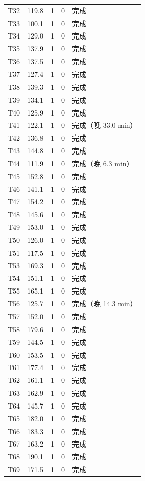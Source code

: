 \documentclass[a4paper,11pt]{article}
\begin{document}
\begin{table}[htbp]
\begin{tabular}{rcccl}
T32 & 119.8 & 1 & 0 & 完成 \\
T33 & 100.1 & 1 & 0 & 完成 \\
T34 & 129.0 & 1 & 0 & 完成 \\
T35 & 137.9 & 1 & 0 & 完成 \\
T36 & 137.5 & 1 & 0 & 完成 \\
T37 & 127.4 & 1 & 0 & 完成 \\
T38 & 139.3 & 1 & 0 & 完成 \\
T39 & 134.1 & 1 & 0 & 完成 \\
T40 & 125.9 & 1 & 0 & 完成 \\
T41 & 122.1 & 1 & 0 & 完成（晚 33.0 min） \\
T42 & 136.8 & 1 & 0 & 完成 \\
T43 & 144.8 & 1 & 0 & 完成 \\
T44 & 111.9 & 1 & 0 & 完成（晚 6.3 min） \\
T45 & 152.8 & 1 & 0 & 完成 \\
T46 & 141.1 & 1 & 0 & 完成 \\
T47 & 154.2 & 1 & 0 & 完成 \\
T48 & 145.6 & 1 & 0 & 完成 \\
T49 & 153.0 & 1 & 0 & 完成 \\
T50 & 126.0 & 1 & 0 & 完成 \\
T51 & 117.5 & 1 & 0 & 完成 \\
T53 & 169.3 & 1 & 0 & 完成 \\
T54 & 151.1 & 1 & 0 & 完成 \\
T55 & 165.1 & 1 & 0 & 完成 \\
T56 & 125.7 & 1 & 0 & 完成（晚 14.3 min） \\
T57 & 152.0 & 1 & 0 & 完成 \\
T58 & 179.6 & 1 & 0 & 完成 \\
T59 & 144.5 & 1 & 0 & 完成 \\
T60 & 153.5 & 1 & 0 & 完成 \\
T61 & 177.4 & 1 & 0 & 完成 \\
T62 & 161.1 & 1 & 0 & 完成 \\
T63 & 162.9 & 1 & 0 & 完成 \\
T64 & 145.7 & 1 & 0 & 完成 \\
T65 & 182.0 & 1 & 0 & 完成 \\
T66 & 183.3 & 1 & 0 & 完成 \\
T67 & 163.2 & 1 & 0 & 完成 \\
T68 & 190.1 & 1 & 0 & 完成 \\
T69 & 171.5 & 1 & 0 & 完成 \\

\end{tabular}
\end{table}
\end{document}
